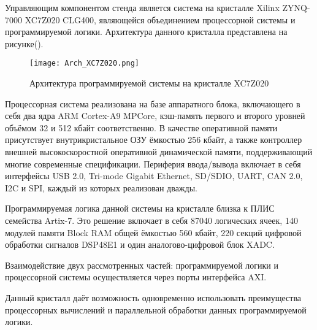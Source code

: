 Управляющим компонентом стенда является система на кристалле Xilinx ZYNQ-7000 XC7Z020 CLG400, являющейся объединением процессорной системы и программируемой логики. Архитектура данного кристалла представлена на рисунке().\par
\begin{figure}[ht]
    \centering
    \texttt{[image: Arch\_XC7Z020.png]}
    \caption{Архитектура программируемой системы на кристалле XC7Z020}
    \label{fig:mpr}
\end{figure}
Процессорная система реализована на базе аппаратного блока, включающего в себя два ядра ARM Cortex-A9 MPCore, кэш-память первого и второго уровней объёмом 32 и 512 кбайт соответственно. В качестве оперативной памяти присутствует внутрикристальное ОЗУ ёмкостью 256 кбайт, а также контроллер внешней высокоскоростной оперативной динамической памяти, поддерживающий многие современные спецификации. Периферия ввода/вывода включает в себя интерфейсы USB 2.0, Tri-mode Gigabit Ethernet, SD/SDIO, UART, CAN 2.0, I2C и SPI, каждый из которых реализован дважды.\par
Программируемая логика данной системы на кристалле близка к ПЛИС семейства Artix-7. Это решение включает в себя 87040 логических ячеек, 140 модулей памяти Block RAM общей ёмкостью 560 кбайт, 220 секций цифровой обработки сигналов DSP48E1 и один аналогово-цифровой блок XADC.\par
Взаимодействие двух рассмотренных частей: программируемой логики и процессорной системы осуществляется через порты интерфейса AXI.\par
Данный кристалл даёт возможность одновременно использовать преимущества процессорных вычислений и параллельной обработки данных программируемой логики.
